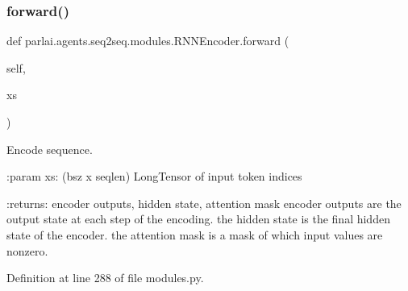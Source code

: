 \subsubsection{\texorpdfstring{forward()}{forward()}}
{\footnotesize\ttfamily def parlai.\+agents.\+seq2seq.\+modules.\+R\+N\+N\+Encoder.\+forward (\begin{DoxyParamCaption}\item[{}]{self,  }\item[{}]{xs }\end{DoxyParamCaption})}

\begin{DoxyVerb}Encode sequence.

:param xs: (bsz x seqlen) LongTensor of input token indices

:returns: encoder outputs, hidden state, attention mask
    encoder outputs are the output state at each step of the encoding.
    the hidden state is the final hidden state of the encoder.
    the attention mask is a mask of which input values are nonzero.
\end{DoxyVerb}
 

Definition at line 288 of file modules.\+py.


